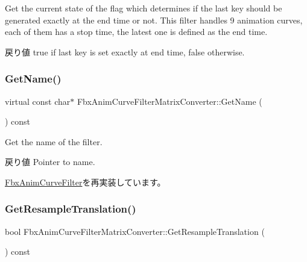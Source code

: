 Get the current state of the flag which determines if the last key should be generated exactly at the end time or not. This filter handles 9 animation curves, each of them has a stop time, the latest one is defined as the end time. \begin{DoxyReturn}{戻り値}
{\ttfamily true} if last key is set exactly at end time, {\ttfamily false} otherwise. 
\end{DoxyReturn}
\mbox{\label{class_fbx_anim_curve_filter_matrix_converter_a264eb163214f398627f4b8e20631b1ab}} 
\subsubsection{\texorpdfstring{Get\+Name()}{GetName()}}
{\footnotesize\ttfamily virtual const char$\ast$ Fbx\+Anim\+Curve\+Filter\+Matrix\+Converter\+::\+Get\+Name (\begin{DoxyParamCaption}{ }\end{DoxyParamCaption}) const\hspace{0.3cm}{\ttfamily [virtual]}}

Get the name of the filter. \begin{DoxyReturn}{戻り値}
Pointer to name. 
\end{DoxyReturn}


\hyperlink{class_fbx_anim_curve_filter_abd559d5052fbb072042e59241940a35c}{Fbx\+Anim\+Curve\+Filter}を再実装しています。

\mbox{\label{class_fbx_anim_curve_filter_matrix_converter_a7603a34315c35f2d9ba8f501059992c5}} 
\subsubsection{\texorpdfstring{Get\+Resample\+Translation()}{GetResampleTranslation()}}
{\footnotesize\ttfamily bool Fbx\+Anim\+Curve\+Filter\+Matrix\+Converter\+::\+Get\+Resample\+Translation (\begin{DoxyParamCaption}{ }\end{DoxyParamCaption}) const}


